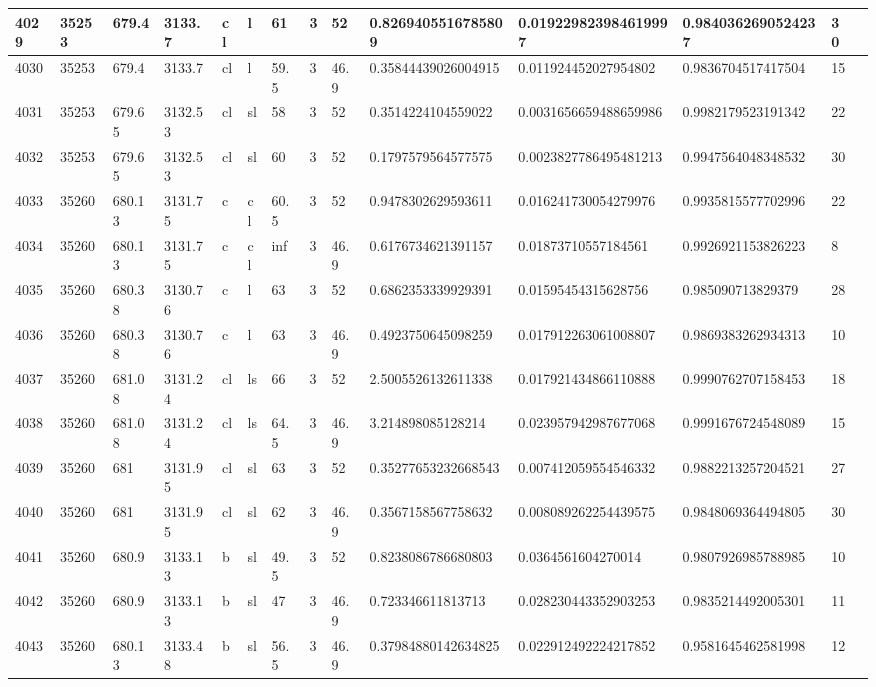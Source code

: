 \documentclass[11pt,a4paper]{article}
\begin{document}
\begin{table}[h]
\begin{tabular}{|l|l|l|l|l|l|l|l|l|l|l|l|l|l|}
4029 & 35253 & 679.4 & 3133.7 & cl & l & 61 & 3 & 52 & 0.8269405516785809 & 0.019229823984619997 & 0.9840362690524237 & 30 &  \\ \hline
4030 & 35253 & 679.4 & 3133.7 & cl & l & 59.5 & 3 & 46.9 & 0.35844439026004915 & 0.011924452027954802 & 0.9836704517417504 & 15 &  \\ \hline
4031 & 35253 & 679.65 & 3132.53 & cl & sl & 58 & 3 & 52 & 0.3514224104559022 & 0.0031656659488659986 & 0.9982179523191342 & 22 &  \\ \hline
4032 & 35253 & 679.65 & 3132.53 & cl & sl & 60 & 3 & 52 & 0.1797579564577575 & 0.0023827786495481213 & 0.9947564048348532 & 30 &  \\ \hline
4033 & 35260 & 680.13 & 3131.75 & c & cl & 60.5 & 3 & 52 & 0.9478302629593611 & 0.016241730054279976 & 0.9935815577702996 & 22 &  \\ \hline
4034 & 35260 & 680.13 & 3131.75 & c & cl & inf & 3 & 46.9 & 0.6176734621391157 & 0.01873710557184561 & 0.9926921153826223 & 8 &  \\ \hline
4035 & 35260 & 680.38 & 3130.76 & c & l & 63 & 3 & 52 & 0.6862353339929391 & 0.01595454315628756 & 0.985090713829379 & 28 &  \\ \hline
4036 & 35260 & 680.38 & 3130.76 & c & l & 63 & 3 & 46.9 & 0.4923750645098259 & 0.017912263061008807 & 0.9869383262934313 & 10 &  \\ \hline
4037 & 35260 & 681.08 & 3131.24 & cl & ls & 66 & 3 & 52 & 2.5005526132611338 & 0.017921434866110888 & 0.9990762707158453 & 18 &  \\ \hline
4038 & 35260 & 681.08 & 3131.24 & cl & ls & 64.5 & 3 & 46.9 & 3.214898085128214 & 0.023957942987677068 & 0.9991676724548089 & 15 &  \\ \hline
4039 & 35260 & 681 & 3131.95 & cl & sl & 63 & 3 & 52 & 0.35277653232668543 & 0.007412059554546332 & 0.9882213257204521 & 27 &  \\ \hline
4040 & 35260 & 681 & 3131.95 & cl & sl & 62 & 3 & 46.9 & 0.3567158567758632 & 0.008089262254439575 & 0.9848069364494805 & 30 &  \\ \hline
4041 & 35260 & 680.9 & 3133.13 & b & sl & 49.5 & 3 & 52 & 0.8238086786680803 & 0.0364561604270014 & 0.9807926985788985 & 10 &  \\ \hline
4042 & 35260 & 680.9 & 3133.13 & b & sl & 47 & 3 & 46.9 & 0.723346611813713 & 0.028230443352903253 & 0.9835214492005301 & 11 &  \\ \hline
4043 & 35260 & 680.13 & 3133.48 & b & sl & 56.5 & 3 & 46.9 & 0.37984880142634825 & 0.022912492224217852 & 0.9581645462581998 & 12 &  \\ \hline

\end{tabular}
\end{table}
\end{document}
